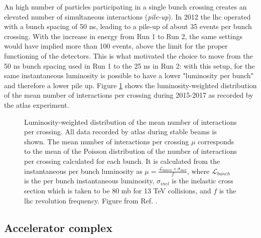 An high number of particles participating in a single bunch crossing creates an elevated number of simultaneous interactions (\textit{pile-up}). In 2012 the \gls{lhc} operated with a bunch spacing of 50 ns, leading to a pile-up of about 35 events per bunch crossing. With the increase in energy from Run 1 to Run 2, the same settings would have implied more than 100 events, above the limit for the proper functioning of the detectors. This is what motivated the choice to move from the 50 ns bunch spacing used in Run 1 to the 25 ns in Run 2: with this setup, for the same instantaneous luminosity is possible to have a lower "luminosity per bunch" and therefore a lower pile up. Figure \ref{fig:atlas:pu} shows the luminosity-weighted distribution of the mean number of interactions per crossing during 2015-2017 as recorded by the \gls{atlas} experiment.

\begin{figure}[ht]
\centering
{}
\caption{Luminosity-weighted distribution of the mean number of interactions per crossing. All data recorded by \gls{atlas} during stable beams is shown. The mean number of interactions per crossing $\mu$ corresponds to the mean of the Poisson distribution of the number of interactions per crossing calculated for each bunch. It is calculated from the instantaneous per bunch luminosity as 
$\mu = \frac{\mathcal{L}_{bunch}\times \sigma_{inel}}{f}$, where $\mathcal{L}_{bunch}$ is the per bunch instantaneous luminosity, $\sigma_{inel}$ is the inelastic cross section which is taken to be 80 mb for 13 TeV collisions, and $f$ is the \gls{lhc} revolution frequency. Figure from Ref. \cite{LumiTwiki}.}
\label{fig:atlas:pu}
\end{figure}


\subsection{Accelerator complex}

